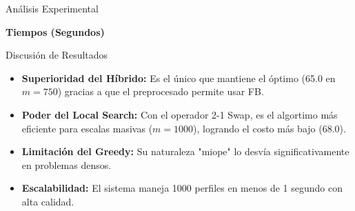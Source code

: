 \documentclass[10pt]{beamer}
\begin{document}
\begin{frame}{Análisis Experimental}
	

			\textbf{Tiempos (Segundos)}

\end{frame}

\begin{frame}{Discusión de Resultados}
    \begin{itemize}
        \item \textbf{Superioridad del Híbrido:} Es el único que mantiene el óptimo (65.0 en $m=750$) gracias a que el preprocesado permite usar FB.
        \item \textbf{Poder del Local Search:} Con el operador 2-1 Swap, es el algortimo más eficiente para escalas masivas ($m=1000$), logrando el costo más bajo (68.0).
        \item \textbf{Limitación del Greedy:} Su naturaleza "miope" lo desvía significativamente en problemas densos.
        \item \textbf{Escalabilidad:} El sistema maneja 1000 perfiles en menos de 1 segundo con alta calidad.
    \end{itemize}
\end{frame}
\end{document}
